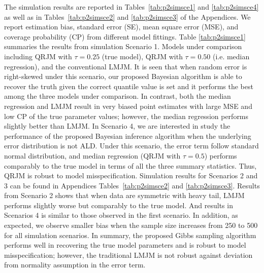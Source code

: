 The simulation results are reported in Tables~\ref{tab:p2simsce1} and \ref{tab:p2simsce4} as well as in Tables~\ref{tab:p2simsce2} and \ref{tab:p2simsce3} of the Appendices. We report estimation bias, standard error (SE), mean square error (MSE), and coverage probability (CP) from different model fittings. Table \ref{tab:p2simsce1} summaries the results from simulation Scenario 1. Models under comparison including QRJM with $\tau=0.25$ (true model), QRJM with $\tau=0.50$ (i.e. median regression), and the conventional LMJM. It is seen that when random error is right-skewed under this scenario, our proposed Bayesian algorithm is able to recover the truth given the correct quantile value is set and it performs the best among the three models under comparison. In contrast, both the median regression and LMJM result in very biased point estimates with large MSE and low CP of the true parameter values; however, the median regression performs slightly better than LMJM. In Scenario 4, we are interested in study the performance of the proposed Bayesian inference algorithm when the underlying error distribution is not ALD. Under this scenario, the error term follow standard normal distribution, and median regression (QRJM with $\tau=0.5$) performs comparably to the true model in terms of all the three summary statistics. Thus, QRJM is robust to model misspecification. Simulation results for Scenarios 2 and 3 can be found in Appendices Tables~\ref{tab:p2simsce2} and \ref{tab:p2simsce3}. Results from Scenario 2 shows that when data are symmetric with heavy tail, LMJM performs slightly worse but comparably to the true model. And results in Scenarios 4 is similar to those observed in the first scenario. In addition, as expected, we observe smaller bias when the sample size increases from 250 to 500 for all simulation scenarios. In summary, the proposed Gibbs sampling algorithm performs well in recovering the true model parameters and is robust to model misspecification; however, the traditional LMJM is not robust against deviation from normality assumption in the error term. 
